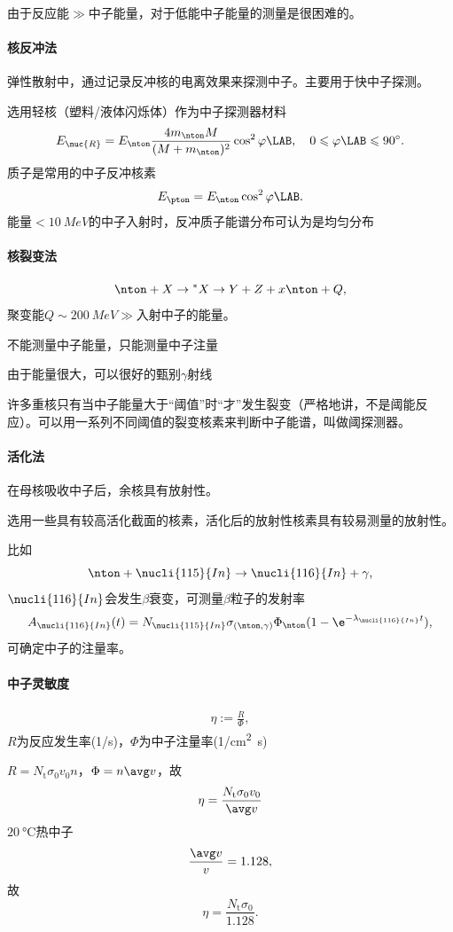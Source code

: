 由于反应能$\gg$中子能量，对于低能中子能量的测量是很困难的。
\paragraph{核反冲法}弹性散射中，通过记录反冲核的电离效果来探测中子。主要用于快中子探测。

选用轻核（塑料/液体闪烁体）作为中子探测器材料
\[
	E_\nuc{R}=E_\nton\frac{4m_\nton M}{(M+m_\nton)^2}\cos^2\varphi\LAB,\quad 0\leqslant\varphi\LAB\leqslant 90^\circ.
\]
质子是常用的中子反冲核素
\[
	E_\pton=E_\nton\cos^2\varphi\LAB.
\]
能量$<\SI{10}{MeV}$的中子入射时，反冲质子能谱分布可认为是均匀分布
\paragraph{核裂变法}
\[
	\nton+X\to{}^\ast X\to Y+Z+x\nton+Q,
\]
聚变能$Q\sim\SI{200}{MeV}\gg$入射中子的能量。
\begin{compactitem}
	\item 不能测量中子能量，只能测量中子注量
	\item 由于能量很大，可以很好的甄别$\gamma$射线
\end{compactitem}
许多重核只有当中子能量大于“阈值”时“才”发生裂变（严格地讲，不是阈能反应）。可以用一系列不同阈值的裂变核素来判断中子能谱，叫做阈探测器。
\paragraph{活化法}
在母核吸收中子后，余核具有放射性。

选用一些具有较高活化截面的核素，活化后的放射性核素具有较易测量的放射性。

比如
\[
	\nton+\nucli{115}{In}\to\nucli{116}{In}+\gamma,
\]
$\nucli{116}{In}$会发生$\beta$衰变，可测量$\beta$粒子的发射率
\[
	A_{\nucli{116}{In}}(t)=N_{\nucli{115}{In}}\sigma_{(\nton,\gamma)}\Phi_\nton(1-\e^{-\lambda_{\nucli{116}{In}}t}),
\]
可确定中子的注量率。
\paragraph{中子灵敏度}
\begin{align}
	\eta:=\frac R\Phi,
\end{align}
$R$为反应发生率(1/s)，$\Phi$为中子注量率(\si{1/cm^2.s})

$R=N_\mathrm t\sigma_0v_0n$，$\Phi=n\avg v$，故 
\[
	\eta=\frac{N_\mathrm t\sigma_0v_0}{\avg v}
\]
$\SI{20}{\celsius}$热中子
\[
	\frac{\avg v}v=1.128,
\]
故
\[
	\eta=\frac{N_\mathrm t\sigma_0}{1.128}.
\]

